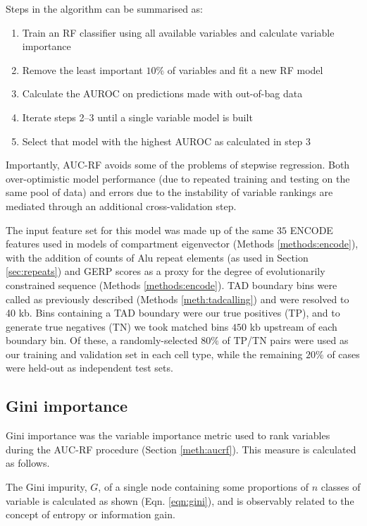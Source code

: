 \documentclass[a4paper,11pt,oneside]{book}
\begin{document}
Steps in the algorithm can be summarised as:\cite{Calle2011}
\begin{enumerate}
\item Train an RF classifier using all available variables and calculate variable importance
\item Remove the least important $10\%$ of variables and fit a new RF model
\item Calculate the AUROC on predictions made with out-of-bag data
\item Iterate steps 2--3 until a single variable model is built
\item Select that model with the highest AUROC as calculated in step 3
\end{enumerate} \vspace{.1em}

Importantly, AUC-RF avoids some of the problems of stepwise regression. Both over-optimistic model performance (due to repeated training and testing on the same pool of data) and errors due to the instability of variable rankings are mediated through an additional cross-validation step.\cite{Calle2011}

The input feature set for this model was made up of the same $35$ ENCODE features used in models of compartment eigenvector (Methods \ref{methods:encode}), with the addition of counts of Alu repeat elements (as used in Section \ref{sec:repeats}) and GERP scores as a proxy for  the degree of evolutionarily constrained sequence (Methods \ref{methods:encode}). TAD boundary bins were called as previously described (Methods \ref{meth:tadcalling}) and were resolved to 40 kb. Bins containing a TAD boundary were our true positives (TP), and to generate true negatives (TN) we took matched bins $450$ kb upstream of each boundary bin. Of these, a randomly-selected $80\%$ of TP/TN pairs were used as our training and validation set in each cell type, while the remaining $20\%$ of cases were held-out as independent test sets.

\subsection{Gini importance}\label{meth:gini}

Gini importance was the variable importance metric used to rank variables during the AUC-RF procedure (Section \ref{meth:aucrf}). This measure is calculated as follows.

The Gini impurity, $G$, of a single node containing some proportions of $n$ classes of variable is calculated as shown (Eqn. \ref{eqn:gini}), and is observably related to the concept of entropy or information gain. 
\end{document}
